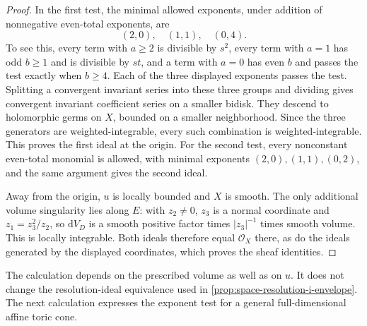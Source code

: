 \begin{proof}
In the first test, the minimal allowed exponents, under addition of nonnegative even-total exponents, are
\[
 (2,0),\quad(1,1),\quad(0,4).
\]
To see this, every term with $a\geq2$ is divisible by $s^2$, every term with $a=1$ has odd $b\geq1$ and is divisible by $st$, and a term with $a=0$ has even $b$ and passes the test exactly when $b\geq4$. Each of the three displayed exponents passes the test. Splitting a convergent invariant series into these three groups and dividing gives convergent invariant coefficient series on a smaller bidisk. They descend to holomorphic germs on $X$, bounded on a smaller neighborhood. Since the three generators are weighted-integrable, every such combination is weighted-integrable. This proves the first ideal at the origin. For the second test, every nonconstant even-total monomial is allowed, with minimal exponents $(2,0),(1,1),(0,2)$, and the same argument gives the second ideal.

Away from the origin, $u$ is locally bounded and $X$ is smooth. The only additional volume singularity lies along $E$: with $z_2\neq0$, $z_3$ is a normal coordinate and $z_1=z_3^2/z_2$, so $\mathrm{d}V_D$ is a smooth positive factor times $|z_3|^{-1}$ times smooth volume. This is locally integrable. Both ideals therefore equal $\mathcal O_X$ there, as do the ideals generated by the displayed coordinates, which proves the sheaf identities.
\end{proof}

The calculation depends on the prescribed volume as well as on $u$. It does not change the resolution-ideal equivalence used in \cref{prop:space-resolution-i-envelope}. The next calculation expresses the exponent test for a general full-dimensional affine toric cone.

